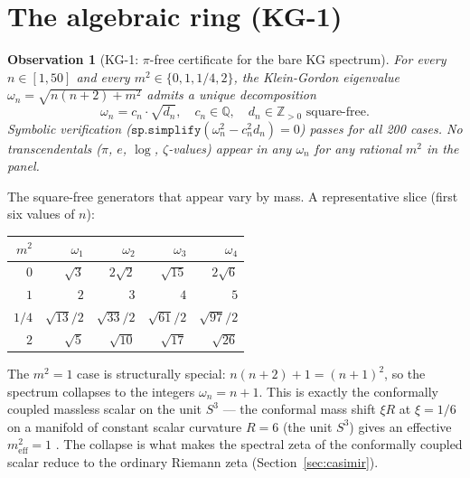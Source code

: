 \documentclass[11pt]{article}
\newtheorem{observation}{Observation}
\begin{document}
\section{The algebraic ring (KG-1)}
\label{sec:ring}

\begin{observation}[KG-1: $\pi$-free certificate for the bare KG spectrum]
\label{obs:ring}
For every $n \in [1, 50]$ and every $m^2 \in \{0, 1, 1/4, 2\}$, the
Klein-Gordon eigenvalue $\omega_n = \sqrt{n(n+2) + m^2}$ admits a unique
decomposition
\begin{equation}
\label{eq:ring_decomp}
\omega_n = c_n \cdot \sqrt{d_n}, \quad c_n \in \mathbb{Q}, \quad
d_n \in \mathbb{Z}_{>0} \text{ square-free.}
\end{equation}
Symbolic verification ($\mathtt{sp.simplify}(\omega_n^2 - c_n^2 d_n) = 0$)
passes for all 200 cases.  No transcendentals ($\pi$, $e$, $\log$,
$\zeta$-values) appear in any $\omega_n$ for any rational $m^2$ in the
panel.
\end{observation}

The square-free generators that appear vary by mass.  A representative
slice (first six values of $n$):

\begin{center}
\small
\begin{tabular}{r r r r r}
\toprule
$m^2$ & $\omega_1$ & $\omega_2$ & $\omega_3$ & $\omega_4$ \\
\midrule
$0$ & $\sqrt{3}$ & $2\sqrt{2}$ & $\sqrt{15}$ & $2\sqrt{6}$ \\
$1$ & $2$ & $3$ & $4$ & $5$ \\
$1/4$ & $\sqrt{13}/2$ & $\sqrt{33}/2$ & $\sqrt{61}/2$ & $\sqrt{97}/2$ \\
$2$ & $\sqrt{5}$ & $\sqrt{10}$ & $\sqrt{17}$ & $\sqrt{26}$ \\
\bottomrule
\end{tabular}
\end{center}

The $m^2 = 1$ case is structurally special: $n(n+2) + 1 = (n+1)^2$, so
the spectrum collapses to the integers $\omega_n = n + 1$.  This is
exactly the conformally coupled massless scalar on the unit $S^3$ ---
the conformal mass shift $\xi R$ at $\xi = 1/6$ on a manifold of
constant scalar curvature $R = 6$ (the unit $S^3$) gives an effective
$m^2_\text{eff} = 1$ \cite{birrell_davies}.  The collapse is what makes
the spectral zeta of the conformally coupled scalar reduce to the
ordinary Riemann zeta (Section~\ref{sec:casimir}).
\end{document}
